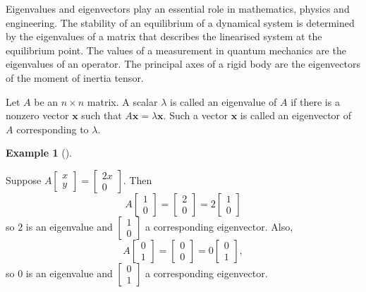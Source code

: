 \documentclass[
  a4paper,
  DIV=11,
  numbers=noendperiod,
  oneside]{scrreprt}
\theoremstyle{definition}
\newtheorem{example}{Example}[chapter]
\theoremstyle{remark}
\newenvironment{fbxSimple}[3]{\begin{tcolorbox}[enhanced, breakable,%
attach boxed title to top*={xshift=1.4pt},
boxed title style={boxrule=0.0mm, fuzzy shadow={1pt}{-1pt}{0mm}{0.1mm}{gray}, arc=.3em, rounded corners=east, sharp corners=west}, colframe=#1-color2, colbacktitle=#1-color1, colback = white, coltitle=black,  titlerule=0mm, toprule=0pt, bottomrule=.7pt, leftrule=.3em, rightrule=.7pt, outer arc=.3em,  	left=.5em, right=.5em, bottomtitle=1mm, toptitle=1mm,title=\textbf{#2}\hspace{0.5em}{#3}]}
{\end{tcolorbox}}
\begin{document}
Eigenvalues and eigenvectors play an essential role in mathematics,
physics and engineering. The stability of an equilibrium of a dynamical
system is determined by the eigenvalues of a matrix that describes the
linearised system at the equilibrium point. The values of a measurement
in quantum mechanics are the eigenvalues of an operator. The principal
axes of a rigid body are the eigenvectors of the moment of inertia
tensor.

\label{eigenvalue-and-eigenvector}
\begin{fbxSimple}{Definition}{Definition 5.1: }{Eigenvalue and Eigenvector}
\label{eigenvalue-and-eigenvector}
Let \(A\) be an \(n \times n\) matrix. A scalar \(\lambda\) is called an
eigenvalue of \(A\) if there is a nonzero vector \(\mathbf{x}\) such
that \(A\mathbf{x} = \lambda \mathbf{x}\). Such a vector \(\mathbf{x}\)
is called an eigenvector of \(A\) corresponding to \(\lambda\).

\end{fbxSimple}

\begin{example}[]\protect\hypertarget{exm-}{}\label{exm-}

Suppose
\(A\left[\begin{array}{c} x \\ y \end{array}\right] = \left[\begin{array}{c} 2x \\ 0 \end{array}\right]\).
Then
\[A\left[\begin{array}{c} 1 \\ 0 \end{array}\right] = \left[\begin{array}{c} 2 \\ 0 \end{array}\right] = 2\left[\begin{array}{c} 1 \\ 0 \end{array}\right]\]
so \(2\) is an eigenvalue and
\(\left[\begin{array}{c} 1 \\ 0 \end{array}\right]\) a corresponding
eigenvector. Also,
\[A\left[\begin{array}{c} 0 \\ 1 \end{array}\right] = \left[\begin{array}{c} 0 \\ 0 \end{array}\right] = 0\left[\begin{array}{c} 0 \\ 1 \end{array}\right],\]
so \(0\) is an eigenvalue and
\(\left[\begin{array}{c} 0 \\ 1 \end{array}\right]\) a corresponding
eigenvector.

\end{example}
\end{document}
